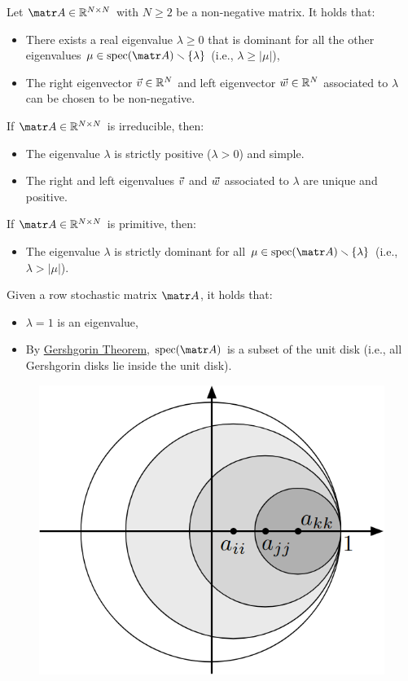 \begin{subappendices}
\begin{theorem} \label{th:perron_frobenius} 
    Let $\A \in \R^{N \times N}$ with $N \geq 2$ be a non-negative matrix. It holds that:
    \begin{itemize}
        \item There exists a real eigenvalue $\lambda \geq 0$ that is dominant for all the other eigenvalues $\mu \in \text{spec}(\A) \smallsetminus \{\lambda\}$ (i.e., $\lambda \geq |\mu|$),
        \item The right eigenvector ${\vec{v}} \in \mathbb{R}^N$ and left eigenvector ${\vec{w}} \in \mathbb{R}^N$ associated to $\lambda$ can be chosen to be non-negative.
    \end{itemize}
    If $\A \in \R^{N \times N}$ is irreducible, then:
    \begin{itemize}
        \item The eigenvalue $\lambda$ is strictly positive ($\lambda > 0$) and simple.
        \item The right and left eigenvalues ${\vec{v}}$ and ${\vec{w}}$ associated to $\lambda$ are unique and positive.
    \end{itemize}
    If $\A \in \R^{N \times N}$ is primitive, then:
    \begin{itemize}
        \item The eigenvalue $\lambda$ is strictly dominant for all $\mu \in \text{spec}(\A) \smallsetminus \{\lambda\}$ (i.e., $\lambda > |\mu|$).
    \end{itemize}
\end{theorem}

\begin{lemma} \label{th:row_stochastic_unit_disk}
    Given a row stochastic matrix $\A$, it holds that:
    \begin{itemize}
        \item $\lambda=1$ is an eigenvalue,
        \item By \hyperref[th:gershgorin]{Gershgorin Theorem}, $\text{spec}(\A)$ is a subset of the unit disk (i.e., all Gershgorin disks lie inside the unit disk).
    \end{itemize}

    \begin{figure}[H]
        \centering
        \includegraphics[width=0.2\linewidth]{./img/gershgorin_unit.png}
    \end{figure}


\end{lemma}
\end{subappendices}
